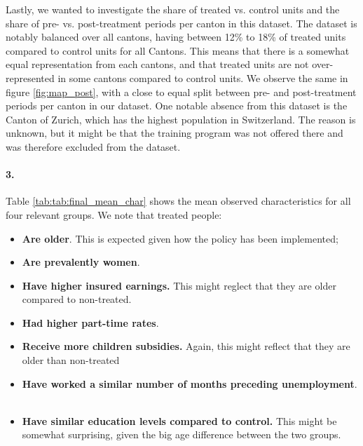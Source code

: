 \documentclass{scrartcl}
\begin{document}
Lastly, we wanted to investigate the share of treated vs. control units and the share of pre- vs. post-treatment periods per canton in this dataset. The dataset is notably balanced over all cantons, having between 12\% to 18\% of treated units compared to control units for all Cantons. This means that there is a somewhat equal representation from each cantons, and that treated units are not over-represented in some cantons compared to control units. We observe the same in figure \ref{fig:map_post}, with a close to equal split between pre- and post-treatment periods per canton in our dataset. One notable absence from this dataset is the Canton of Zurich, which has the highest population in Switzerland. The reason is unknown, but it might be that the training program was not offered there and was therefore excluded from the dataset.


  
\paragraph*{3.}

Table \ref{tab:tab:final_mean_char} shows the mean observed characteristics for all four relevant groups. We note that treated people:

\begin{itemize}[label=$\blacktriangleright$]
    \item \textbf{Are older}. This is expected given how the policy has been implemented; \
    \item \textbf{Are prevalently women}. \
    \item \textbf{Have higher insured earnings.} This might reglect that they are older compared to non-treated. \
    \item \textbf{Had higher part-time rates}. \
    \item \textbf{Receive more children subsidies.} Again, this might reflect that they are older than non-treated \
    \item \textbf{Have worked a similar number of months preceding unemployment}. \ 
    \item \textbf{Have similar education levels compared to control.} This might be somewhat surprising, given the big age difference between the two groups. 
    
\end{itemize}
\end{document}
